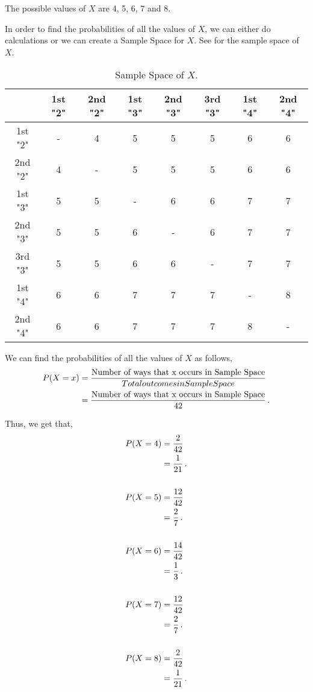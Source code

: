 \begin{subquestions}
\begin{subsubquestions}

\subsubquestion

The possible values of $X$ are 4, 5, 6, 7 and 8.


\subsubquestion

In order to find the probabilities of all the values of $X$, we can either do calculations or we can create a Sample Space for $X$. See  for the sample space of $X$.

\begin{table}[ht]
	\centering
	\begin{tabular}{|c|c|c|c|c|c|c|c|}	
	\hline
	  & 1st "2" & 2nd "2" & 1st "3" & 2nd "3" & 3rd "3" & 1st "4" & 2nd "4" \\
	\hline 
	1st "2" & - & 4 & 5 & 5 & 5 & 6 & 6 \\
	\hline
	2nd "2" & 4 & - & 5 & 5 & 5 & 6 & 6 \\
	\hline
	1st "3" & 5 & 5 & - & 6 & 6 & 7 & 7 \\
	\hline
	2nd "3" & 5 & 5 & 6 & - & 6 & 7 & 7  \\
	\hline
	3rd "3" & 5 & 5 & 6 & 6 & - & 7 & 7 \\
	\hline
	1st "4" & 6 & 6 & 7 & 7 & 7 & - & 8  \\
	\hline
	2nd "4" & 6 & 6 & 7 & 7 & 7 & 8 & -  \\
	\hline	
	\end{tabular}
	\caption{\label{2012:q4:Sample} Sample Space of $X$.}
\end{table}

We can find the probabilities of all the values of $X$ as follows,
\begin{align}
	P(X=x) & = \frac{\text{Number of ways that x occurs in Sample Space}}{Total outcomes in Sample Space} \nonumber \\
	       & = \frac{\text{Number of ways that x occurs in Sample Space}}{42}\,.	
\end{align}

Thus, we get that,
\begin{align}
	P(X=4) & = \frac{2}{42} \nonumber \\
	       & = \frac{1}{21} \,. \\ \nonumber \\
	P(X=5) & = \frac{12}{42} \nonumber \\
	       & = \frac{2}{7} \,.	\\ \nonumber \\
	P(X=6) & = \frac{14}{42} \nonumber \\
	       & = \frac{1}{3} \,. \\ \nonumber \\
	P(X=7) & = \frac{12}{42} \nonumber \\
		   & = \frac{2}{7} \,.\\ \nonumber \\
	P(X=8) & = \frac{2}{42} \nonumber \\
		   & = \frac{1}{21} \,.	   
\end{align}


\end{subsubquestions}
\end{subquestions}
